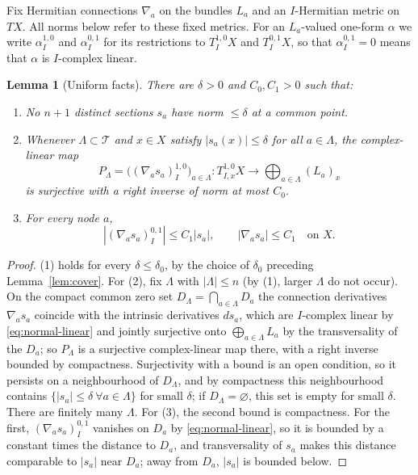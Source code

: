 \documentclass[11pt]{article}
\newtheorem{lemma}[theorem]{Lemma}
\theoremstyle{remark}
\newcommand{\cT}{\mathcal T}
\begin{document}
Fix Hermitian connections $\nabla_a$ on the bundles $L_a$ and an
$I$-Hermitian metric on $TX$. All norms below refer to these fixed
metrics. For an $L_a$-valued one-form $\alpha$ we write
$\alpha^{1,0}_I$ and $\alpha^{0,1}_I$ for its restrictions to
$T^{1,0}_IX$ and $T^{0,1}_IX$, so that $\alpha^{0,1}_I=0$ means that
$\alpha$ is $I$-complex linear.

\begin{lemma}[Uniform facts]\label{lem:uniform}
There are $\delta>0$ and $C_0,C_1>0$ such that:
\begin{enumerate}
\item No $n+1$ distinct sections $s_a$ have norm $\le\delta$ at a
common point.
\item Whenever $\Lambda\subset\cT$ and $x\in X$ satisfy $|s_a(x)|\le\delta$
for all $a\in\Lambda$, the complex-linear map
\begin{equation}\label{eq:PK}
 P_\Lambda=\bigl((\nabla_as_a)^{1,0}_I\bigr)_{a\in\Lambda}
 \colon T^{1,0}_{I,x}X\longrightarrow\bigoplus_{a\in\Lambda}(L_a)_x
\end{equation}
is surjective with a right inverse of norm at most $C_0$.
\item For every node $a$,
\begin{equation}\label{eq:anti}
 |(\nabla_as_a)^{0,1}_I|\le C_1|s_a|,\qquad|\nabla_as_a|\le C_1
 \quad\text{on }X.
\end{equation}
\end{enumerate}
\end{lemma}

\begin{proof}
(1) holds for every $\delta\le\delta_0$, by the choice of $\delta_0$
preceding Lemma~\ref{lem:cover}. For (2), fix
$\Lambda$ with $|\Lambda|\le n$ (by (1), larger $\Lambda$ do not occur).
On the compact common zero set $D_\Lambda=\bigcap_{a\in\Lambda}D_a$ the
connection derivatives $\nabla_as_a$ coincide with the intrinsic
derivatives $ds_a$, which are $I$-complex linear by
\eqref{eq:normal-linear} and jointly surjective onto
$\bigoplus_{a\in\Lambda}L_a$ by the transversality of the $D_a$; so
$P_\Lambda$ is a surjective complex-linear map there, with a right
inverse bounded by compactness. Surjectivity with a bound is an open
condition, so it persists on a neighbourhood of $D_\Lambda$, and by
compactness this neighbourhood contains
$\{|s_a|\le\delta\ \forall a\in\Lambda\}$ for small $\delta$; if
$D_\Lambda=\varnothing$, this set is empty for small $\delta$. There are
finitely many $\Lambda$. For (3), the second bound is compactness.
For the first, $(\nabla_as_a)^{0,1}_I$ vanishes on $D_a$ by
\eqref{eq:normal-linear}, so it is bounded by a constant times the
distance to $D_a$, and transversality of $s_a$ makes this distance
comparable to $|s_a|$ near $D_a$; away from $D_a$, $|s_a|$ is bounded
below.
\end{proof}
\end{document}
